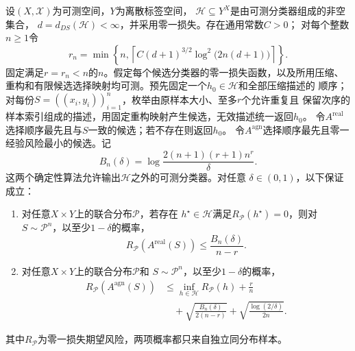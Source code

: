 \begin{theorem}[有限DS维的期望风险保证]
\label{thm:finite-ds-learning-rates}
设$(X,\mathcal X)$为可测空间，$Y$为离散标签空间，
$\mathcal H\subseteq Y^X$是由可测分类器组成的非空集合，
$d=d_{DS}(\mathcal H)<\infty$，并采用零一损失。存在通用常数$C>0$；
对每个整数$n\geq1$令
\[
 r_n=\min\!\left\{n,\left\lceil
 C(d+1)^{3/2}\log^2\!\bigl(2n(d+1)\bigr)\right\rceil\right\}.
\]
固定满足$r=r_n<n$的$n$。假定每个候选分类器的零一损失函数，以及所用压缩、
重构和有限候选选择映射均可测。预先固定一个$h_0\in\mathcal H$和全部压缩描述的
顺序；对每份$S=((x_i,y_i))_{i=1}^n$，枚举由原样本大小、至多$r$个允许重复且
保留次序的样本索引组成的描述，用固定重构映射产生候选，无效描述统一返回$h_0$。
令$A^{\mathrm{real}}$选择顺序最先且与$S$一致的候选；若不存在则返回$h_0$。
令$A^{\mathrm{agn}}$选择顺序最先且零一经验风险最小的候选。记
\[
 B_n(\delta)=\log\frac{2(n+1)(r+1)n^r}{\delta}.
\]
这两个确定性算法允许输出$\mathcal H$之外的可测分类器。对任意
$\delta\in(0,1)$，以下保证成立：
\begin{enumerate}
\item 对任意$X\times Y$上的联合分布$\mathcal P$，若存在
$h^\star\in\mathcal H$满足$R_{\mathcal P}(h^\star)=0$，则对
$S\sim\mathcal P^n$，以至少$1-\delta$的概率，
 \[
 R_{\mathcal P}(A^{\mathrm{real}}(S))
 \leq\frac{B_n(\delta)}{n-r}.
 \]
\item 对任意$X\times Y$上的联合分布$\mathcal P$和
$S\sim\mathcal P^n$，以至少$1-\delta$的概率，
 \begin{align*}
 R_{\mathcal P}(A^{\mathrm{agn}}(S))
 &\leq\inf_{h\in\mathcal H}R_{\mathcal P}(h)+\frac rn\\
 &\quad+\sqrt{\frac{B_n(\delta)}{2(n-r)}}
       +\sqrt{\frac{\log(2/\delta)}{2n}}.
 \end{align*}
\end{enumerate}
其中$R_{\mathcal P}$为零一损失期望风险，两项概率都只来自独立同分布样本。
\end{theorem}

